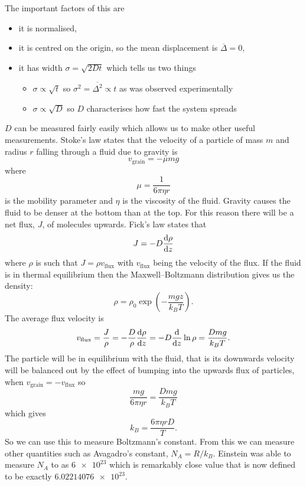 \documentclass[a4paper]{article}
\begin{document}
    The important factors of this are
    \begin{itemize}
        \item it is normalised,
        \item it is centred on the origin, so the mean displacement is \(\overline{\Delta} = 0\),
        \item it has width \(\sigma = \sqrt{2Dt}\) which tells us two things
        \begin{itemize}
            \item \(\sigma \propto \sqrt{t}\) so \(\sigma^2 = \overline{\Delta^2} \propto t\) as was observed experimentally
            \item \(\sigma \propto \sqrt{D}\) so \(D\) characterises how fast the system spreads
        \end{itemize}
    \end{itemize}
    \(D\) can be measured fairly easily which allows us to make other useful measurements.
    Stoke's law states that the velocity of a particle of mass \(m\) and radius \(r\) falling through a fluid due to gravity is
    \[v_{\text{grain}} = -\mu mg\]
    where
    \[\mu = \frac{1}{6\pi\eta r}\]
    is the mobility parameter and \(\eta\) is the viscosity of the fluid.
    Gravity causes the fluid to be denser at the bottom than at the top.
    For this reason there will be a net flux, \(J\), of molecules upwards.
    Fick's law states that
    \[J = -D\dv{\rho}{z}\]
    where \(\rho\) is such that \(J = \rho v_{\text{flux}}\) with \(v_{\text{flux}}\) being the velocity of the flux.
    If the fluid is in thermal equilibrium then the Maxwell--Boltzmann distribution gives us the density:
    \[\rho = \rho_0\exp\left(-\frac{mgz}{k_BT}\right).\]
    The average flux velocity is
    \[v_{\text{flux}} = \frac{J}{\rho} = -\frac{D}{\rho}\dv{\rho}{z} = -D\dv{z}\ln\rho = \frac{Dmg}{k_BT}.\]
    The particle will be in equilibrium with the fluid, that is its downwards velocity will be balanced out by the effect of bumping into the upwards flux of particles, when \(v_{\text{grain}} = -v_{\text{flux}}\) so
    \[\frac{mg}{6\pi\eta r} = \frac{Dmg}{k_BT}\]
    which gives
    \[k_B = \frac{6\pi\eta rD}{T}.\]
    So we can use this to measure Boltzmann's constant.
    From this we can measure other quantities such as Avagadro's constant, \(N_A = R/k_B\).
    Einstein was able to measure \(N_A\) to as \(\num{6e23}\) which is remarkably close value that is now defined to be exactly \(\num{6.02214076e23}\).
    
\end{document}
